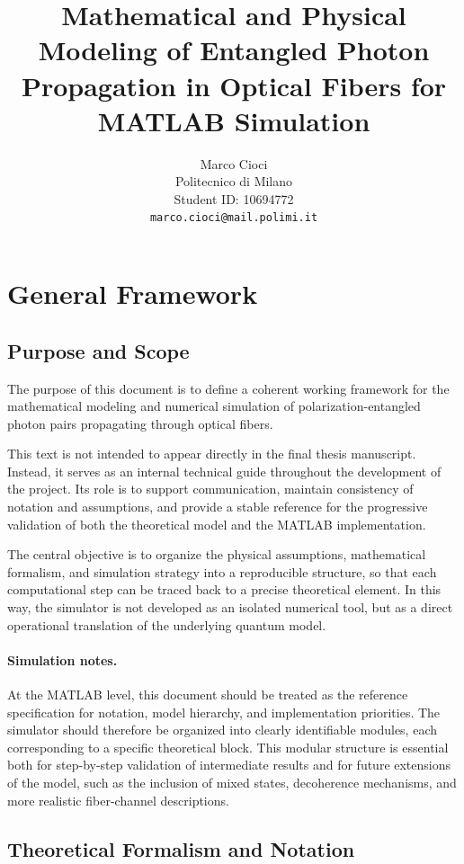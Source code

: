 \documentclass[a4paper]{article}
\title{Mathematical and Physical Modeling of Entangled Photon Propagation in Optical Fibers for MATLAB Simulation}
\author{Marco Cioci\\
Politecnico di Milano\\
Student ID: 10694772\\
\texttt{marco.cioci@mail.polimi.it}}
\date{}
\begin{document}
\maketitle

\tableofcontents

\newpage
\section{General Framework}

\subsection{Purpose and Scope}
The purpose of this document is to define a coherent working framework for the mathematical modeling and numerical simulation of polarization-entangled photon pairs propagating through optical fibers.

This text is not intended to appear directly in the final thesis manuscript. Instead, it serves as an internal technical guide throughout the development of the project. Its role is to support communication, maintain consistency of notation and assumptions, and provide a stable reference for the progressive validation of both the theoretical model and the MATLAB implementation.

The central objective is to organize the physical assumptions, mathematical formalism, and simulation strategy into a reproducible structure, so that each computational step can be traced back to a precise theoretical element. In this way, the simulator is not developed as an isolated numerical tool, but as a direct operational translation of the underlying quantum model.

\paragraph{Simulation notes.}
At the MATLAB level, this document should be treated as the reference specification for notation, model hierarchy, and implementation priorities. The simulator should therefore be organized into clearly identifiable modules, each corresponding to a specific theoretical block. This modular structure is essential both for step-by-step validation of intermediate results and for future extensions of the model, such as the inclusion of mixed states, decoherence mechanisms, and more realistic fiber-channel descriptions.

\subsection{Theoretical Formalism and Notation}
\end{document}
